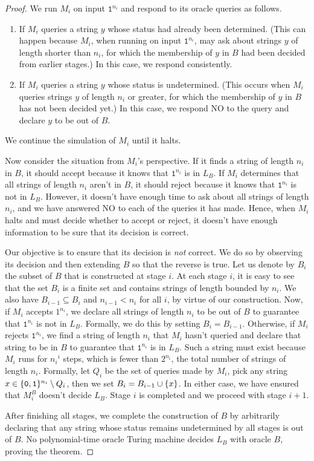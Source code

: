 \begin{proof}
  We run $M_i$ on input $\texttt{1}^{n_i}$ and respond to its oracle queries as follows.
  \begin{enumerate}
    \item If $M_i$ queries a string $y$ whose status had already been determined. (This can happen because $M_i$, when running on input $\texttt{1}^{n_i}$, may ask about strings $y$ of length shorter than $n_i$, for which the membership of $y$ in $B$ had been decided from earlier stages.) In this case, we respond consistently.
    \item If $M_i$ queries a string $y$ whose status is undetermined. (This occurs when $M_i$ queries strings $y$ of length $n_i$ or greater, for which the membership of $y$ in $B$ has not been decided yet.) In this case, we respond NO to the query and declare $y$ to be out of $B$.
  \end{enumerate}
  We continue the simulation of $M_i$ until it halts.

  Now consider the situation from $M_i$'s perspective. If it finds a string of length $n_i$ in $B$, it should accept because it knows that $\texttt{1}^{n_i}$ is in $L_B$. If $M_i$ determines that all strings of length $n_i$ aren't in $B$, it should reject because it knows that $\texttt{1}^{n_i}$ is not in $L_B$. However, it doesn't have enough time to ask about all strings of length $n_i$, and we have answered NO to each of the queries it has made. Hence, when $M_i$ halts and must decide whether to accept or reject, it doesn't have enough information to be sure that its decision is correct.

  Our objective is to ensure that its decision is \emph{not} correct. We do so by observing its decision and then extending $B$ so that the reverse is true. Let us denote by $B_i$ the subset of $B$ that is constructed at stage $i$. At each stage $i$, it is easy to see that the set $B_i$ is a finite set and contains strings of length bounded by $n_i$. We also have $B_{i - 1} \subseteq B_i$ and $n_{i - 1} < n_i$ for all $i$, by virtue of our construction. Now, if $M_i$ accepts $1^{n_i}$, we declare all strings of length $n_i$ to be out of $B$ to guarantee that $\texttt{1}^{n_i}$ is not in $L_B$. Formally, we do this by setting $B_i = B_{i - 1}$. Otherwise, if $M_i$ rejects $\texttt{1}^{n_i}$, we find a string of length $n_i$ that $M_i$ hasn't queried and declare that string to be in $B$ to guarantee that $\texttt{1}^{n_i}$ is in $L_B$. Such a string must exist because $M_i$ runs for ${n_i}^i$ steps, which is fewer than $2^{n_i}$, the total number of strings of length $n_i$. Formally, let $Q_i$ be the set of queries made by $M_i$, pick any string $x \in \{ \texttt{0}, \texttt{1} \}^{n_i} \setminus Q_i$, then we set $B_i = B_{i - 1} \cup \{ x \}$. In either case, we have ensured that $M_i^B$ doesn't decide $L_B$. Stage $i$ is completed and we proceed with stage $i + 1$.

  After finishing all stages, we complete the construction of $B$ by arbitrarily declaring that any string whose status remains undetermined by all stages is out of $B$. No polynomial-time oracle Turing machine decides $L_B$ with oracle $B$, proving the theorem.
\end{proof}

